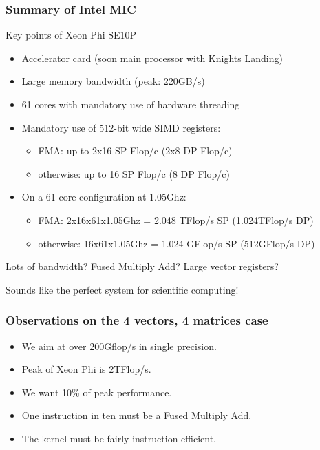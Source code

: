 \documentclass{beamer}
\newcommand{\MIC}{Intel MIC\xspace}
\begin{document}
\begin{frame}
  \frametitle{Summary of \MIC}

  \begin{block}{Key points of Xeon Phi SE10P}
    \begin{itemize}
    \item Accelerator card (soon main processor with Knights Landing) 
    \item Large memory bandwidth (peak: 220GB/s)
    \item 61 cores with mandatory use of hardware threading
    \item Mandatory use of 512-bit wide SIMD registers: 
      \begin{itemize} 
      \item FMA: up to 2x16 SP Flop/c (2x8 DP Flop/c)
      \item otherwise: up to 16 SP Flop/c (8 DP Flop/c)
      \end{itemize}
    \item On a 61-core configuration at 1.05Ghz:
      \begin{itemize} 
      \item FMA: 2x16x61x1.05Ghz = 2.048 TFlop/s SP (1.024TFlop/s DP)
      \item otherwise: 16x61x1.05Ghz = 1.024 GFlop/s SP (512GFlop/s DP)
      \end{itemize}
    \end{itemize}
  \end{block}

  Lots of bandwidth? Fused Multiply Add? Large vector registers?

  Sounds like the perfect system for scientific computing!
\end{frame}


\begin{frame}
  \frametitle{Observations on the 4 vectors, 4 matrices case}

  \begin{itemize}
  \item We aim at over 200Gflop/s in single precision.
  \item Peak of Xeon Phi is 2TFlop/s.
  \item We want 10\% of peak performance.
  \item One instruction in ten must be a Fused Multiply Add.
  \item The kernel must be fairly instruction-efficient.
  \end{itemize}
\end{frame}
\end{document}
